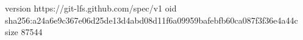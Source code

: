 version https://git-lfs.github.com/spec/v1
oid sha256:a24a6e9c367e06d25de13d4abd08d11f6a09959bafebfb60ca087f3f36e4a44c
size 87544
